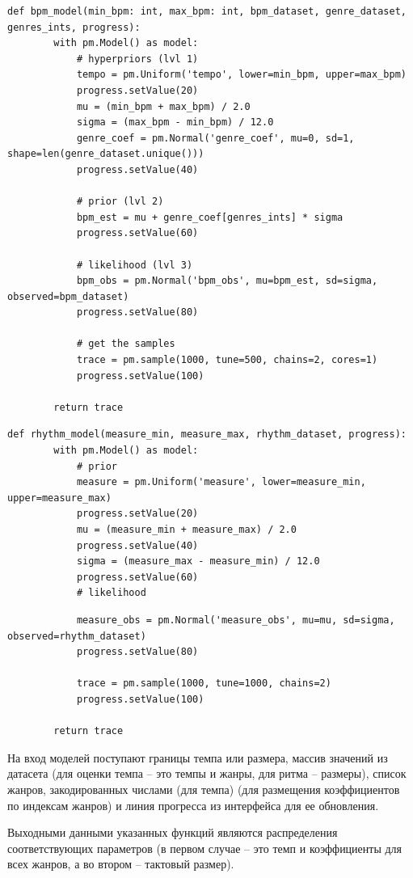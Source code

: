 \newpage

\begin{lstlisting}[label={lst:bpmmodel}, caption={реализация байесовской модели для определения темпа}]
	def bpm_model(min_bpm: int, max_bpm: int, bpm_dataset, genre_dataset, genres_ints, progress):
		with pm.Model() as model:
			# hyperpriors (lvl 1)
			tempo = pm.Uniform('tempo', lower=min_bpm, upper=max_bpm)
			progress.setValue(20)
			mu = (min_bpm + max_bpm) / 2.0
			sigma = (max_bpm - min_bpm) / 12.0
			genre_coef = pm.Normal('genre_coef', mu=0, sd=1, shape=len(genre_dataset.unique()))
			progress.setValue(40)
	
			# prior (lvl 2)
			bpm_est = mu + genre_coef[genres_ints] * sigma
			progress.setValue(60)
	
			# likelihood (lvl 3)
			bpm_obs = pm.Normal('bpm_obs', mu=bpm_est, sd=sigma, observed=bpm_dataset)
			progress.setValue(80)
	
			# get the samples
			trace = pm.sample(1000, tune=500, chains=2, cores=1)
			progress.setValue(100)
	
		return trace
\end{lstlisting}

\begin{lstlisting}[label={lst:measuremodel}, caption={реализация байесовской модели для определения ритма}]
	def rhythm_model(measure_min, measure_max, rhythm_dataset, progress):
		with pm.Model() as model:
			# prior
			measure = pm.Uniform('measure', lower=measure_min, upper=measure_max)
			progress.setValue(20)
			mu = (measure_min + measure_max) / 2.0
			progress.setValue(40)
			sigma = (measure_max - measure_min) / 12.0
			progress.setValue(60)
			# likelihood
\end{lstlisting}

\begin{lstlisting}
			measure_obs = pm.Normal('measure_obs', mu=mu, sd=sigma, observed=rhythm_dataset)
			progress.setValue(80)

			trace = pm.sample(1000, tune=1000, chains=2)
			progress.setValue(100)
	
		return trace
\end{lstlisting}

На вход моделей поступают границы темпа или размера, массив значений из датасета (для оценки темпа -- это темпы и жанры, для ритма -- размеры), список жанров, закодированных числами (для темпа) (для размещения коэффициентов по индексам жанров) и линия прогресса из интерфейса для ее обновления.

Выходными данными указанных функций являются распределения соответствующих параметров (в первом случае -- это темп и коэффициенты для всех жанров, а во втором -- тактовый размер).

